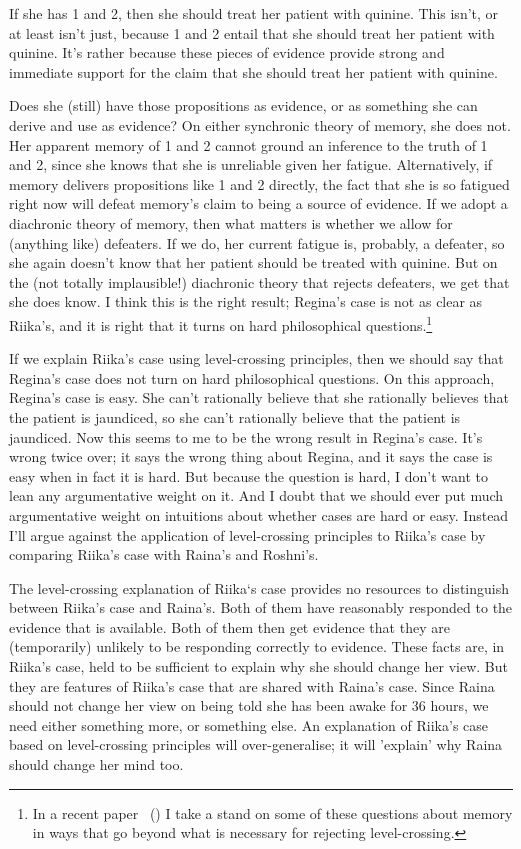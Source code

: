 \documentclass[
  10pt,
  letterpaper,
  twoside]{scrbook}
\begin{document}
If she has 1 and 2, then she should treat her patient with quinine. This
isn't, or at least isn't just, because 1 and 2 entail that she should
treat her patient with quinine. It's rather because these pieces of
evidence provide strong and immediate support for the claim that she
should treat her patient with quinine.

Does she (still) have those propositions as evidence, or as something
she can derive and use as evidence? On either synchronic theory of
memory, she does not. Her apparent memory of 1 and 2 cannot ground an
inference to the truth of 1 and 2, since she knows that she is
unreliable given her fatigue. Alternatively, if memory delivers
propositions like 1 and 2 directly, the fact that she is so fatigued
right now will defeat memory's claim to being a source of evidence. If
we adopt a diachronic theory of memory, then what matters is whether we
allow for (anything like) defeaters. If we do, her current fatigue is,
probably, a defeater, so she again doesn't know that her patient should
be treated with quinine. But on the (not totally implausible!)
diachronic theory that rejects defeaters, we get that she does know. I
think this is the right result; {Regina}'s case is not as clear as
{Riika}'s, and it is right that it turns on hard philosophical
questions.\footnote{In a recent paper
  ~() I take a stand on
  some of these questions about memory in ways that go beyond what is
  necessary for rejecting level-crossing.}

If we explain {Riika}'s case using level-crossing principles, then we
should say that {Regina}'s case does not turn on hard philosophical
questions. On this approach, {Regina}'s case is easy. She can't
rationally believe that she rationally believes that the patient is
jaundiced, so she can't rationally believe that the patient is
jaundiced. Now this seems to me to be the wrong result in {Regina}'s
case. It's wrong twice over; it says the wrong thing about {Regina}, and
it says the case is easy when in fact it is hard. But because the
question is hard, I don't want to lean any argumentative weight on it.
And I doubt that we should ever put much argumentative weight on
intuitions about whether cases are hard or easy. Instead I'll argue
against the application of level-crossing principles to {Riika}'s case
by comparing {Riika}'s case with Raina's and {Roshni}'s.

The level-crossing explanation of {Riika}`s case provides no resources
to distinguish between {Riika}'s case and Raina's. Both of them have
reasonably responded to the evidence that is available. Both of them
then get evidence that they are (temporarily) unlikely to be responding
correctly to evidence. These facts are, in {Riika}'s case, held to be
sufficient to explain why she should change her view. But they are
features of {Riika}'s case that are shared with Raina's case. Since
Raina should not change her view on being told she has been awake for 36
hours, we need either something more, or something else. An explanation
of {Riika}'s case based on level-crossing principles will
over-generalise; it will 'explain' why Raina should change her mind too.
\end{document}
